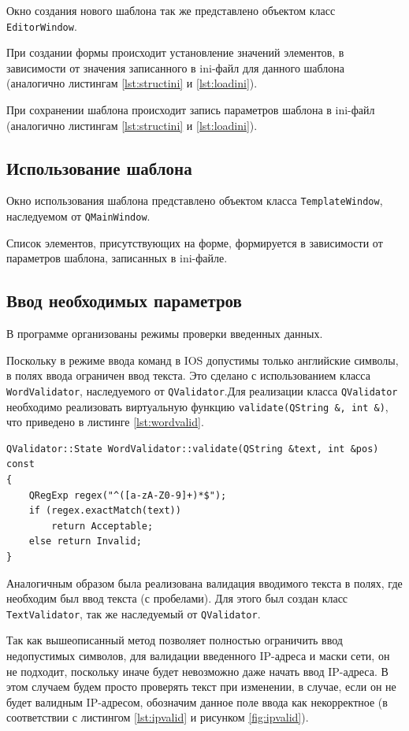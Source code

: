 Окно создания нового шаблона так же представлено объектом класс \texttt{EditorWindow}. 

При создании формы происходит установление значений элементов, в зависимости от значения записанного в ini-файл для данного шаблона (аналогично листингам \ref{lst:structini} и \ref{lst:loadini}).

При сохранении шаблона происходит запись параметров шаблона в ini-файл (аналогично листингам \ref{lst:structini} и \ref{lst:loadini}).

\subsection{Использование шаблона}

Окно использования шаблона представлено объектом класса \texttt{TemplateWindow}, наследуемом от \texttt{QMainWindow}.

Список элементов, присутствующих на форме, формируется в зависимости от параметров шаблона, записанных в ini-файле.

\subsection{Ввод необходимых параметров}

В программе организованы режимы проверки введенных данных.

Поскольку в режиме ввода команд в IOS допустимы только английские символы, в полях ввода ограничен ввод текста. Это сделано с использованием класса \texttt{WordValidator}, наследуемого от \texttt{QValidator}.Для реализации класса \texttt{QValidator} необходимо реализовать виртуальную функцию \texttt{validate(QString \&, int \&)}, что приведено в листинге \ref{lst:wordvalid}.

\begin{lstlisting}[label=lst:wordvalid,caption=Валидация введенного текста]
QValidator::State WordValidator::validate(QString &text, int &pos) const
{
	QRegExp regex("^([a-zA-Z0-9]+)*$");
	if (regex.exactMatch(text))
		return Acceptable;
	else return Invalid;
}
\end{lstlisting}

Аналогичным образом была реализована валидация вводимого текста в полях, где необходим был ввод текста (с пробелами). Для этого был создан класс \texttt{TextValidator}, так же наследуемый от \texttt{QValidator}.

Так как вышеописанный метод позволяет полностью ограничить ввод недопустимых символов, для валидации введенного IP-адреса и маски сети, он не подходит, поскольку иначе будет невозможно даже начать ввод IP-адреса. В этом случаем будем просто проверять текст при изменении, в случае, если он не будет валидным IP-адресом, обозначим данное поле ввода как некорректное (в соответствии с листингом \ref{lst:ipvalid} и рисунком \ref{fig:ipvalid}).

